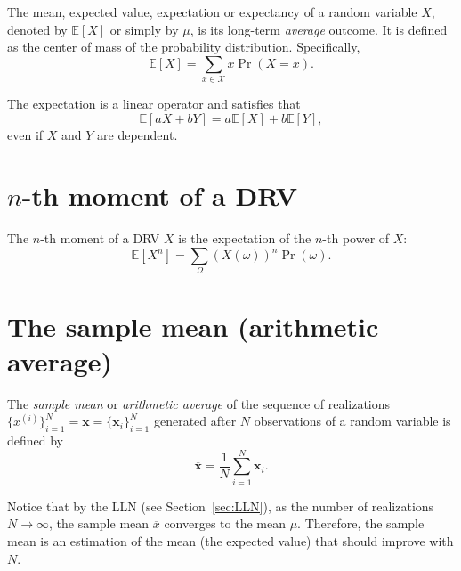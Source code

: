 The mean, expected value, expectation or expectancy of a random
variable $X$, denoted by $\mathbb{E}[X]$ or simply by $\mu$, is its
long-term \emph{average} outcome. It is defined as the center of mass
of the probability distribution. Specifically,
\begin{equation}
  \mathbb{E}[X] = \sum_{x\in\mathcal{X}}x\Pr(X=x).
  \label{eq:expectation}
\end{equation}

The expectation is a linear operator and satisfies that
\begin{equation}
  \mathbb{E}[aX+bY] = a\mathbb{E}[X] + b\mathbb{E}[Y],
\end{equation}
even if $X$ and $Y$ are dependent.


\section{$n$-th moment of a \gls{DRV}}

The $n$-th moment of a \gls{DRV} $X$ is the expectation of the
$n$-th power of $X$:
\begin{equation}
  \mathbb{E}[X^n] = \sum_\Omega(X(\omega))^n\Pr(\omega).
  \label{eq:moments}
\end{equation}


\section{The sample mean (arithmetic average)}

\label{sec:average}
The \emph{sample mean} or \emph{arithmetic average} of the sequence of
realizations $\{x^{(i)}\}_{i=1}^{N}=\bm{x}=\{\bm{x}_i\}_{i=1}^{N}$
generated after $N$ observations of a random variable is defined by
\begin{equation}
  \overline{\bm{x}} = \frac{1}{N}\sum_{i=1}^{N}\bm{x}_i.
  \label{eq:average}
\end{equation}

Notice that by the \gls{LLN} (see Section~\ref{sec:LLN}), as the
number of realizations $N\rightarrow\infty$, the sample mean
$\overline{x}$ converges to the mean $\mu$. Therefore, the sample mean
is an estimation of the mean (the expected value) that should improve
with $N$.


